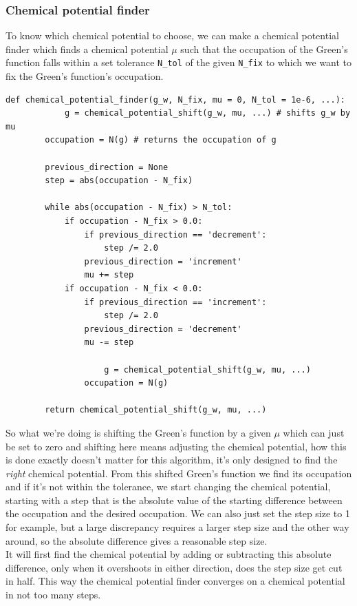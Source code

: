 \documentclass[12pt]{article}
\begin{document}
\subsubsection*{Chemical potential finder}
To know which chemical potential to choose, we can make a chemical potential finder which finds a chemical potential $\mu$ such that the occupation of the Green's function falls within a set tolerance \texttt{N\_tol} of the given \texttt{N\_fix} to which we want to fix the Green's function's occupation.
\begin{lstlisting}[style=mystyle]
    def chemical_potential_finder(g_w, N_fix, mu = 0, N_tol = 1e-6, ...):
    		g = chemical_potential_shift(g_w, mu, ...) # shifts g_w by mu
        occupation = N(g) # returns the occupation of g
        
        previous_direction = None
        step = abs(occupation - N_fix)
        
        while abs(occupation - N_fix) > N_tol:
            if occupation - N_fix > 0.0:
                if previous_direction == 'decrement':
                    step /= 2.0
                previous_direction = 'increment'
                mu += step
            if occupation - N_fix < 0.0:
                if previous_direction == 'increment':
                    step /= 2.0
                previous_direction = 'decrement'
                mu -= step
            
    				g = chemical_potential_shift(g_w, mu, ...)
        		occupation = N(g)
  
        return chemical_potential_shift(g_w, mu, ...)
\end{lstlisting}
\newpage
\noindent
So what we're doing is shifting the Green's function by a given $\mu$ which can just be set to zero and shifting here means adjusting the chemical potential, how this is done exactly doesn't matter for this algorithm, it's only designed to find the \textit{right} chemical potential. From this shifted Green's function we find its occupation and if it's not within the tolerance, we start changing the chemical potential, starting with a step that is the absolute value of the starting difference between the occupation and the desired occupation. We can also just set the step size to 1 for example, but a large discrepancy requires a larger step size and the other way around, so the absolute difference gives a reasonable step size.\\
It will first find the chemical potential by adding or subtracting this absolute difference, only when it overshoots in either direction, does the step size get cut in half. This way the chemical potential finder converges on a chemical potential in not too many steps.\\
\end{document}
